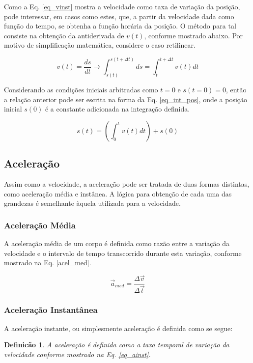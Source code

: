 \documentclass[a4paper, 11pt]{report}
\newtheorem{mydef}{Definicão}
\begin{document}
Como a  Eq. \ref{eq_vinst} mostra a velocidade como taxa de variação da 
posição, pode interessar, em casos como estes, que, a partir da velocidade 
dada como função do tempo, se obtenha a função horária da posição. 
O método para tal consiste na obtenção da antiderivada de $v(t)$, conforme 
mostrado abaixo. Por motivo de simplificação matemática, considere o caso 
retilinear.

$$
v(t) = \frac{d s}{dt} \rightarrow 
\int_{s(t)}^{s(t+\Delta t)}ds = \int_{t}^{t+\Delta t}{v(t) dt}
$$


Considerando as condições iniciais arbitradas como $t=0$ e $s(t=0)=0$, então
a relação anterior pode ser escrita na forma da Eq. \ref{eq_int_pos}, onde 
a posição inicial $s(0)$ é a constante adicionada na integração definida.

\begin{equation}
    s(t) = \left( \int_{0}^{t} v(t) dt \right) + s(0)
    \label{eq_int_pos}
\end{equation}

\subsection{Aceleração}
Assim como a velocidade, a aceleração pode ser tratada de duas formas 
distintas, como aceleração média e instânea. A lógica para obtenção de cada uma
das grandezas é semelhante àquela utilizada para a velocidade. 

\subsubsection*{Aceleração Média}
A aceleração média de um corpo é definida como razão entre a variação da 
velocidade e o intervalo de tempo transcorrido durante esta variação, conforme
mostrado na Eq. \ref{acel_med}.

\begin{equation}
    \vec{a}_{med} = \frac{\Delta \vec{v}}{\Delta \vec{t}}
    \label{acel_med}
\end{equation}

\subsubsection*{Aceleração Instantânea}
A aceleração instante, ou simplesmente aceleração é definida como se segue:

\begin{mydef}
    A aceleração é definida como a taxa temporal de variação da velocidade 
    conforme mostrado na Eq. \ref{eq_ainst}. 
\end{mydef}
\end{document}
